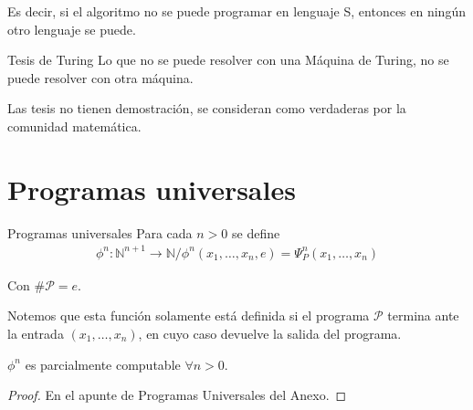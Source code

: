 Es decir, si el algoritmo no se puede programar en lenguaje S, entonces en 
ningún otro lenguaje se puede.

\medskip

\begin{tesis}{Tesis de Turing}{}
    Lo que no se puede resolver con una Máquina de Turing, no se puede resolver
    con otra máquina.
\end{tesis}

Las tesis no tienen demostración, se consideran como verdaderas por la 
comunidad matemática.

\section{Programas universales}

\begin{definicion}{Programas universales}{}
    Para cada $n > 0$ se define
    \begin{gather*}
        \phi^n : \mathbb{N}^{n+1} \to \mathbb{N} /
        \phi^n (x_1, \dotsc, x_n, e) = \Psi_P^n (x_1, \dotsc, x_n) 
    \end{gather*}

    Con $\# \mathcal{P}= e$.
\end{definicion}

Notemos que esta función solamente está definida si el programa $\mathcal{P}$ 
termina ante la entrada $(x_1, \dotsc, x_n)$, en cuyo caso devuelve
la salida del programa.

\medskip

\begin{teorema}{}{}
    $\phi^n$ es parcialmente computable $\forall n > 0$.
\end{teorema}

\begin{proof} 
    En el apunte de Programas Universales del Anexo.
\end{proof}


